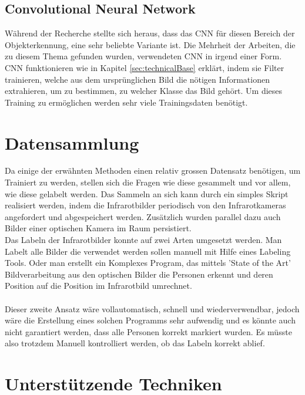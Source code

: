 \subsection{Convolutional Neural Network}

Während der Recherche stellte sich heraus, dass das \gls{CNN} für diesen Bereich der Objekterkennung, eine sehr beliebte Variante ist. Die Mehrheit der Arbeiten, die zu diesem Thema gefunden wurden, verwendeten \gls{CNN} in irgend einer Form.\\
\gls{CNN} funktionieren wie in Kapitel \ref{sec:technicalBase} erklärt, indem sie Filter trainieren, welche aus dem ursprünglichen Bild die nötigen Informationen extrahieren, um zu bestimmen, zu welcher Klasse das Bild gehört. Um dieses Training zu ermöglichen werden sehr viele Trainingsdaten benötigt.


\section{Datensammlung}

Da einige der erwähnten Methoden einen relativ grossen Datensatz benötigen, um Trainiert zu werden, stellen sich die Fragen wie diese gesammelt und vor allem, wie diese gelabelt werden. Das Sammeln an sich kann durch ein simples Skript realisiert werden, indem die Infrarotbilder periodisch von den Infrarotkameras angefordert und abgespeichert werden. Zusätzlich wurden parallel dazu auch Bilder einer optischen Kamera im Raum persistiert.\\
Das Labeln der Infrarotbilder konnte auf zwei Arten umgesetzt werden. Man Labelt alle Bilder die verwendet werden sollen manuell mit Hilfe eines Labeling Tools. Oder man erstellt ein Komplexes Program, das mittels 'State of the Art' Bildverarbeitung aus den optischen Bilder die Personen erkennt und deren Position auf die Position im Infrarotbild umrechnet.\\
\\
Dieser zweite Ansatz wäre vollautomatisch, schnell und wiederverwendbar, jedoch wäre die Erstellung eines solchen Programms sehr aufwendig und es könnte auch nicht garantiert werden, dass alle Personen korrekt markiert wurden. Es müsste also trotzdem Manuell kontrolliert werden, ob das Labeln korrekt ablief. 


\section{Unterstützende Techniken}

